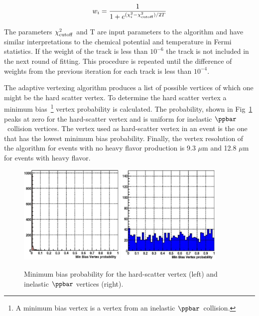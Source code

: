 \begin{equation}
\label{pvweight}
w_{i} = \frac{1}{1+e^{(\chi^{2}_{i} - \chi^{2}_{\rm{cutoff}})/2T}}
\end{equation}

The parameters $\chi^{2}_{\rm{cutoff}}$ and T are input parameters to the algorithm and have similar interpretations to the chemical potential and temperature in Fermi statistics. If the weight of the track is less than $10^{-6}$ the track is not included in the next round of fitting. This procedure is repeated until the difference of weights from the previous iteration for each track is less than $10^{-4}$.

The adaptive vertexing algorithm produces a list of possible vertices of which one might be the hard scatter vertex. To determine the hard scatter vertex a minimum bias~\footnote{A minimum bias vertex is a vertex from an inelastic $\ppbar$~collision.} vertex probability is calculated. The probability, shown in Fig~\ref{minbias} peaks at zero for the hard-scatter vertex and is uniform for inelastic $\ppbar$~collision vertices. The vertex used as hard-scatter vertex in an event is the one that has the lowest minimum bias probability. Finally, the vertex resolution of the algorithm for events with no heavy flavor production is 9.3 $\mu$m and 12.8 $\mu$m for events with heavy flavor.

\begin{figure}[!h!tbp]
\begin{center}
\includegraphics[width=0.45\textwidth]{eps/Reco/MBP_PV.eps}
\includegraphics[width=0.45\textwidth]{eps/Reco/MBP_MB.eps}
\end{center}
\vspace{-0.1in}
\caption[minbias]{Minimum bias probability for the hard-scatter vertex (left) and inelastic $\ppbar$ vertices (right).}
\label{minbias}
\end{figure}


